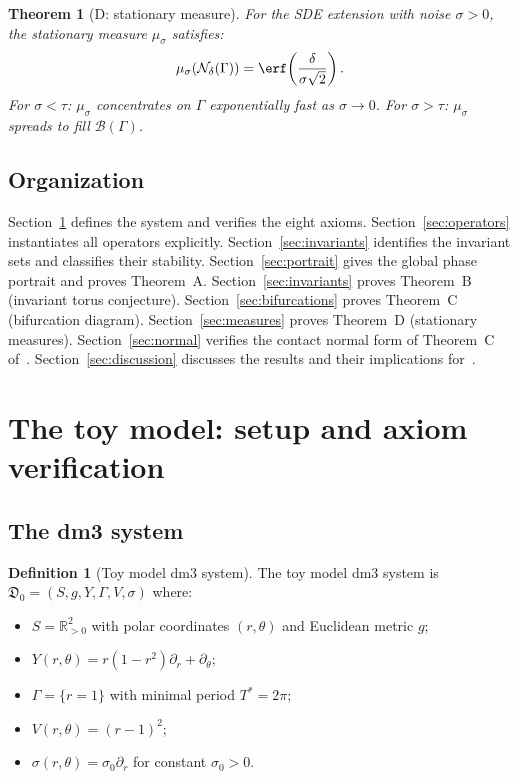 \documentclass[12pt, oneside]{book}
\theoremstyle{plain}
\newtheorem{theorem}{Theorem}[section]
\theoremstyle{definition}
\newtheorem{definition}{Definition}[section]
\theoremstyle{remark}
\newcommand{\R}{\mathbb{R}}
\newcommand{\dm}{\mathfrak{D}}
\newcommand{\Orb}{\Gamma}
\newcommand{\cN}{\mathcal{N}}
\newcommand{\cB}{\mathcal{B}}
\begin{document}
\begin{theorem}[D: stationary measure]\label{thm:D}
For the SDE extension with noise $\sigma>0$, the stationary measure
$\mu_\sigma$ satisfies:
\[
  \mu_\sigma(\cN_\delta(\Orb)) = \erf\!\left(\frac{\delta}{\sigma\sqrt{2}}\right).
\]
For $\sigma<\tau$: $\mu_\sigma$ concentrates on $\Orb$ exponentially
fast as $\sigma\to 0$. For $\sigma>\tau$: $\mu_\sigma$ spreads to
fill $\cB(\Orb)$.
\end{theorem}

\subsection{Organization}

Section~\ref{sec:setup} defines the system and verifies the eight
axioms.
Section~\ref{sec:operators} instantiates all operators explicitly.
Section~\ref{sec:invariants} identifies the invariant sets and
classifies their stability.
Section~\ref{sec:portrait} gives the global phase portrait and
proves Theorem~A.
Section~\ref{sec:invariants} proves Theorem~B (invariant torus conjecture).
Section~\ref{sec:bifurcations} proves Theorem~C (bifurcation diagram).
Section~\ref{sec:measures} proves Theorem~D (stationary measures).
Section~\ref{sec:normal} verifies the contact normal form of
Theorem~C of~\cite{Paper1}.
Section~\ref{sec:discussion} discusses the results and their
implications for~\cite{Paper1}.

\section{The toy model: setup and axiom verification}\label{sec:setup}

\subsection{The dm3 system}

\begin{definition}[Toy model dm3 system]\label{def:toy}
The toy model dm3 system is
$\dm_0=(S,g,Y,\Orb,V,\sigma)$ where:
\begin{itemize}[leftmargin=*]
  \item $S=\R^2_{>0}$ with polar coordinates $(r,\theta)$ and
        Euclidean metric $g$;
  \item $Y(r,\theta)=r(1-r^2)\partial_r+\partial_\theta$;
  \item $\Orb=\{r=1\}$ with minimal period $T^*=2\pi$;
  \item $V(r,\theta)=(r-1)^2$;
  \item $\sigma(r,\theta)=\sigma_0\partial_r$ for constant $\sigma_0>0$.
\end{itemize}
\end{definition}
\end{document}
